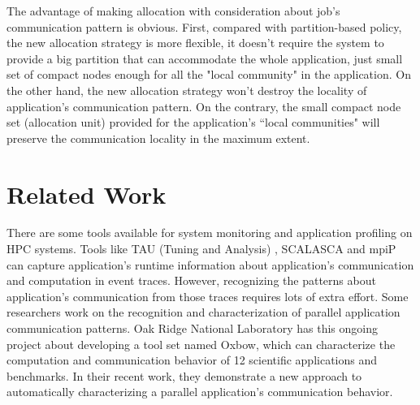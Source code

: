 \documentclass[conference]{IEEEtran}
\begin{document}
The advantage of making allocation with consideration about job's communication pattern is obvious. First, compared with partition-based policy, the new allocation strategy is more flexible, it doesn't require the system to provide a big partition that can accommodate the whole application, just small set of compact nodes enough for all the "local community" in the application. On the other hand, the new allocation strategy won't destroy the locality of application's communication pattern. On the contrary, the small compact node set (allocation unit) provided for the application's  ``local communities"  will preserve the communication locality in the maximum extent.


%
%




\section{Related Work}
\label{sec:related_work}
There are some tools available for system monitoring and application profiling on HPC systems. Tools like TAU (Tuning and Analysis) \cite{tau}, SCALASCA\cite{scala} and mpiP\cite{mpip} can capture application's runtime information about application's communication and computation in event traces. However, recognizing the patterns about application's communication from those traces requires lots of extra effort. Some researchers work on the recognition and characterization of parallel application communication patterns. Oak Ridge National Laboratory has this ongoing project about developing a tool set named Oxbow, which can characterize the computation and communication behavior of 12 scientific applications and benchmarks\cite{oxbow}. In their recent work\cite{hpdc2015-ornl}, they demonstrate a new approach to automatically characterizing a parallel application's communication behavior. 
\end{document}
